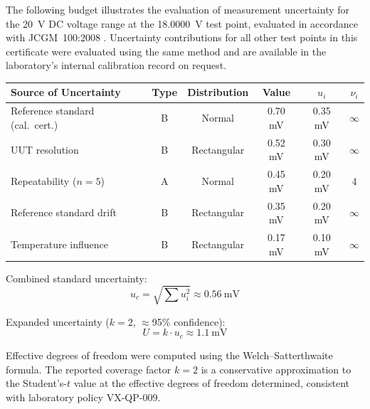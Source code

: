 
The following budget illustrates the evaluation of measurement uncertainty for the
20~V DC voltage range at the 18.0000~V test point, evaluated in accordance with
JCGM~100:2008 \cite{gum2008}. Uncertainty contributions for all other test points in
this certificate were evaluated using the same method and are available in the
laboratory's internal calibration record on request.

\vspace{4pt}
\begin{center}
\small
\begin{tabular}{@{}lccccc@{}}
  \toprule
  Source of Uncertainty & Type & Distribution & Value & $u_i$ & $\nu_i$ \\
  \midrule
  Reference standard (cal.\ cert.) & B & Normal & 0.70 mV & 0.35 mV & $\infty$ \\
  UUT resolution & B & Rectangular & 0.52 mV & 0.30 mV & $\infty$ \\
  Repeatability ($n=5$) & A & Normal & 0.45 mV & 0.20 mV & 4 \\
  Reference standard drift & B & Rectangular & 0.35 mV & 0.20 mV & $\infty$ \\
  Temperature influence & B & Rectangular & 0.17 mV & 0.10 mV & $\infty$ \\
  \bottomrule
\end{tabular}
\end{center}

\vspace{6pt}
\noindent
\begin{minipage}[t]{0.48\linewidth}
  \small
  Combined standard uncertainty:
  \[ u_c = \sqrt{\textstyle\sum u_i^2} \approx 0.56~\text{mV} \]
\end{minipage}\hfill
\begin{minipage}[t]{0.48\linewidth}
  \small
  Expanded uncertainty ($k=2$, $\approx$95\% confidence):
  \[ U = k \cdot u_c \approx 1.1~\text{mV} \]
\end{minipage}
\par

\vspace{4pt}
{\small\color{certgray} Effective degrees of freedom were computed using the
Welch--Satterthwaite formula. The reported coverage factor $k=2$ is a conservative
approximation to the Student's-$t$ value at the effective degrees of freedom
determined, consistent with laboratory policy VX-QP-009.}
